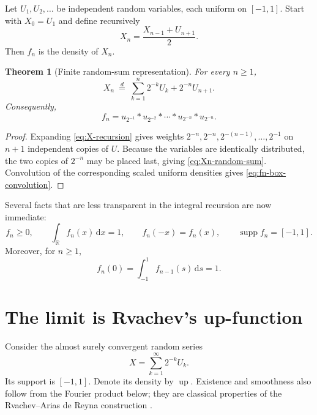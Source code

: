 \documentclass[11pt,oneside]{article}
\newtheorem{theorem}{Theorem}[section]
\theoremstyle{definition}
\theoremstyle{remark}
\newcommand{\R}{\mathbb R}
\newcommand{\Up}{\operatorname{up}}
\newcommand{\supp}{\operatorname{supp}}
\newcommand{\conv}{*}
\newcommand{\dd}{\,\mathrm d}
\begin{document}
Let $U_1,U_2,\ldots$ be independent random variables, each uniform on $[-1,1]$.
Start with $X_0=U_1$ and define recursively
\begin{equation}
 X_n=\frac{X_{n-1}+U_{n+1}}{2}.
 \label{eq:X-recursion}
\end{equation}
Then $f_n$ is the density of $X_n$.

\begin{theorem}[Finite random-sum representation]
\label{thm:finite-random-sum}
For every $n\ge1$,
\begin{equation}
 X_n\ \stackrel{d}{=}\
 \sum_{k=1}^{n}2^{-k}U_k+2^{-n}U_{n+1}.
 \label{eq:Xn-random-sum}
\end{equation}
Consequently,
\begin{equation}
 f_n=u_{2^{-1}}\conv u_{2^{-2}}\conv\cdots\conv
 u_{2^{-n}}\conv u_{2^{-n}}.
 \label{eq:fn-box-convolution}
\end{equation}
\end{theorem}

\begin{proof}
Expanding \eqref{eq:X-recursion} gives weights
$2^{-n},2^{-n},2^{-(n-1)},\ldots,2^{-1}$ on $n+1$ independent copies of $U$.
Because the variables are identically distributed, the two copies of $2^{-n}$ may be
placed last, giving \eqref{eq:Xn-random-sum}.  Convolution of the corresponding scaled
uniform densities gives \eqref{eq:fn-box-convolution}.
\end{proof}

Several facts that are less transparent in the integral recursion are now immediate:
\begin{equation}
 f_n\ge0,
 \qquad \int_{\R}f_n(x)\dd x=1,
 \qquad f_n(-x)=f_n(x),
 \qquad \supp f_n=[-1,1].
 \label{eq:basic-fn-properties}
\end{equation}
Moreover, for $n\ge1$,
\begin{equation}
 f_n(0)=\int_{-1}^{1}f_{n-1}(s)\dd s=1.
 \label{eq:fn-zero-one}
\end{equation}

\section{The limit is Rvachev's up-function}
\label{sec:limit-identification}

Consider the almost surely convergent random series
\begin{equation}
 X=\sum_{k=1}^{\infty}2^{-k}U_k.
 \label{eq:up-random-series}
\end{equation}
Its support is $[-1,1]$.  Denote its density by $\Up$.  Existence and smoothness also follow
from the Fourier product below; they are classical properties of the Rvachev--Arias de
Reyna construction \cite{arias1982}.
\end{document}
